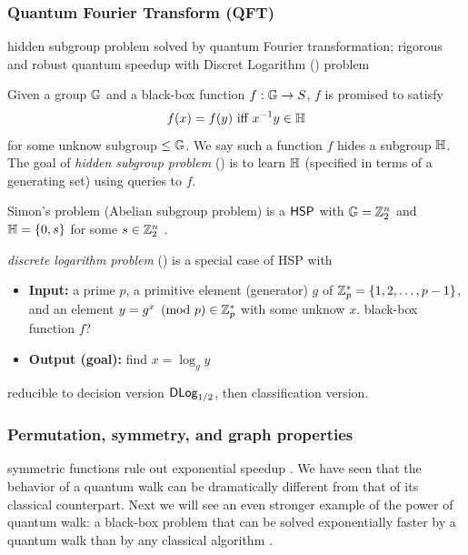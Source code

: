 \subsubsection{Quantum Fourier Transform (QFT)}
hidden subgroup problem solved by quantum Fourier transformation\cite{childsQuantumAlgorithmsAlgebraic2010};
rigorous and robust quantum speedup with Discret Logarithm (\dlog) problem \cite{liuRigorousRobustQuantum2021}
\begin{definition}\label{prm:hidden_subgroup}
	Given a group $\mathbb{G}$ and a black-box function $f:\mathbb{G}\to S$, 
	$f$ is promised to satisfy 
	\begin{equation}
		f(x) =f(y) \text{ iff } x^{-1}y \in \mathbb{H} 
	\end{equation}
	for some unknow subgroup $\le \mathbb{G}$.
	We say such a function $f$ hides a subgroup $\mathbb{H}$.
	The goal of \emph{hidden subgroup problem} (\hsp) is to learn $\mathbb{H}$
	(specified in terms of a generating set) using queries to $f$.
\end{definition}
\begin{remark}
	Simon's problem (Abelian subgroup problem) is a $\textsf{HSP}$ with $\mathbb{G} = \mathbb{Z}^n_2$ and $\mathbb{H} = \qty{ 0, s }$ for some $s \in \mathbb{Z}_2^n$ .
\end{remark}
\begin{definition}\label{prm:dlog}
	\emph{discrete logarithm problem} (\dlog) is a special case of HSP with 
	\begin{itemize}
		\item \textbf{Input:} a prime $p$, a primitive element (generator) $g$ of $\mathbb{Z}_p^*=\qty{1,2,\dots,p-1}$, and an element $y=g^x \pmod{p} \in\mathbb{Z}_p^*$ with some unknow $x$. black-box function $f$?
		\item \textbf{Output (goal):} find $x=\log_g y$
	\end{itemize}
\end{definition}
reducible to decision version $\textsf{DLog}_{1/2}$, then classification version.

\subsubsection{Permutation, symmetry, and graph properties}
symmetric functions rule out exponential speedup
\cite{ben-davidSymmetriesGraphProperties2020}.
We have seen that the behavior of a quantum walk can be dramatically different from that of its classical counterpart. Next we will see an even stronger example of the power of quantum walk: a black-box problem that can be solved exponentially faster by a quantum walk than by any classical algorithm \cite{childsExponentialAlgorithmicSpeedup2003}.

